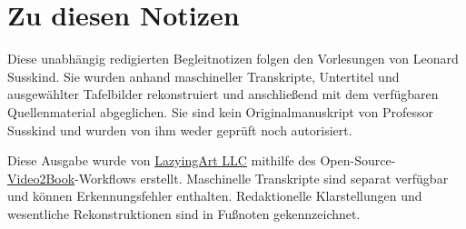 \documentclass[11pt,oneside]{book}
\begin{document}
\frontmatter
\hypersetup{pageanchor=false}

\hypersetup{pageanchor=true}

\clearpage
\chapter*{Zu diesen Notizen}
Diese unabhängig redigierten Begleitnotizen folgen den Vorlesungen von Leonard Susskind. Sie wurden anhand maschineller Transkripte, Untertitel und ausgewählter Tafelbilder rekonstruiert und anschließend mit dem verfügbaren Quellenmaterial abgeglichen. Sie sind kein Originalmanuskript von Professor Susskind und wurden von ihm weder geprüft noch autorisiert.

Diese Ausgabe wurde von \href{https://lazying.art}{LazyingArt LLC} mithilfe des Open-Source-\href{https://github.com/lachlanchen/Video2Book}{Video2Book}-Workflows erstellt. Maschinelle Transkripte sind separat verfügbar und können Erkennungsfehler enthalten. Redaktionelle Klarstellungen und wesentliche Rekonstruktionen sind in Fußnoten gekennzeichnet.
\clearpage
\tableofcontents
\mainmatter










\end{document}
